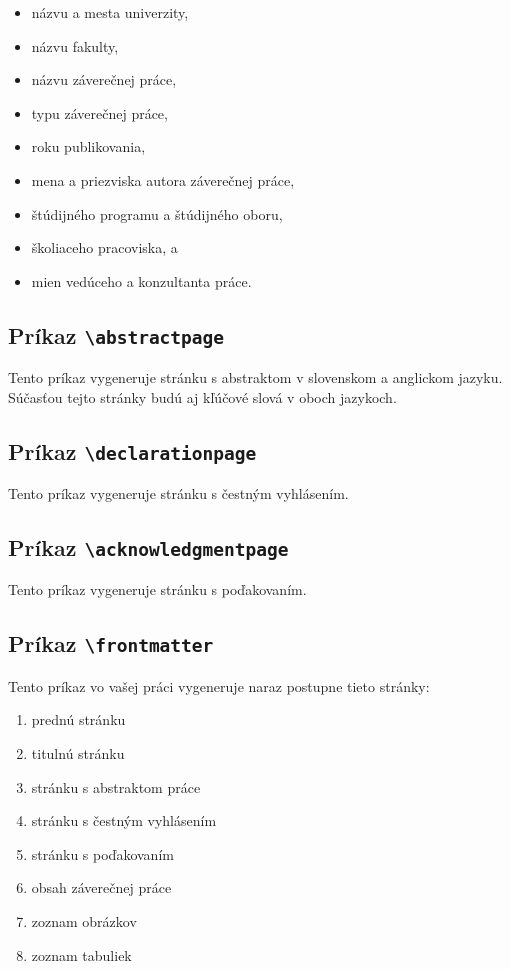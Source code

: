 \begin{itemize}
    \item názvu a mesta univerzity,
    \item názvu fakulty,
    \item názvu záverečnej práce,
    \item typu záverečnej práce,
    \item roku publikovania,
    \item mena a priezviska autora záverečnej práce,
    \item štúdijného programu a štúdijného oboru,
    \item školiaceho pracoviska, a
    \item mien vedúceho a konzultanta práce.
\end{itemize}


\subsection{Príkaz {\tt \textbackslash{}abstractpage}}

Tento príkaz vygeneruje stránku s abstraktom v slovenskom a anglickom jazyku. Súčasťou tejto stránky budú aj kľúčové slová v oboch jazykoch.


\subsection{Príkaz {\tt \textbackslash{}declarationpage}}

Tento príkaz vygeneruje stránku s čestným vyhlásením.


\subsection{Príkaz {\tt \textbackslash{}acknowledgmentpage}}

Tento príkaz vygeneruje stránku s poďakovaním.


\subsection{Príkaz {\tt \textbackslash{}frontmatter}}

Tento príkaz vo vašej práci vygeneruje naraz postupne tieto stránky:

\begin{enumerate}
    \item prednú stránku
    \item titulnú stránku
    \item stránku s abstraktom práce
    \item stránku s čestným vyhlásením
    \item stránku s poďakovaním
    \item obsah záverečnej práce
    \item zoznam obrázkov
    \item zoznam tabuliek
\end{enumerate}

